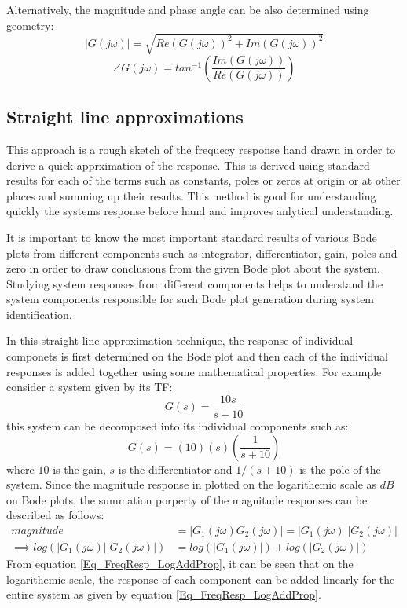 Alternatively, the magnitude and phase angle can be also determined using geometry:
\begin{equation} \label{Eq_FeResMagEquation}
	|G(j \omega)| = \sqrt{Re(G(j \omega))^{2} + Im(G(j \omega))^{2}}
\end{equation}
\begin{equation} \label{Eq_FeResPhaseEquation}
	\angle G(j \omega) = tan^{-1}\left( \frac{Im(G(j \omega))}{Re(G(j \omega))} \right)
\end{equation}

\subsection{Straight line approximations}

This approach is a rough sketch of the frequecy response hand drawn in order to derive a quick apprximation of the response. This is derived using standard results for each of the terms such as constants, poles or zeros at origin or at other places and summing up their results. This method is good for understanding quickly the systems response before hand and improves anlytical understanding.

It is important to know the most important standard results of various Bode plots from different components such as integrator, differentiator, gain, poles and zero in order to draw conclusions from the given Bode plot about the system. Studying system responses from different components helps to understand the system components responsible for such Bode plot generation during system identification.

In this straight line approximation technique, the response of individual componets is first determined on the Bode plot and then each of the individual responses is added together using some mathematical properties. For example consider a system given by its TF:
\begin{equation}
	G(s) = \frac{10 s}{s + 10}
\end{equation}
this system can be decomposed into its individual components such as:
\begin{equation}
	G(s) = (10) (s) \left( \frac{1}{s + 10} \right)
\end{equation}
where $10$ is the gain, $s$ is the differentiator and $1 / (s + 10)$ is the pole of the system. Since the magnitude response in plotted on the logarithemic scale as $dB$ on Bode plots, the summation porperty of the magnitude responses can be described as follows:
\begin{align}
	magnitude &= |G_{1}(j\omega) G_{2}(j\omega)| = |G_{1}(j\omega)||G_{2}(j\omega)| \\
	\implies log(|G_{1}(j\omega)||G_{2}(j\omega)|) &= log(|G_{1}(j\omega)|) + log(|G_{2}(j\omega)|) \label{Eq_FreqResp_LogAddProp}
\end{align}
From equation \eqref{Eq_FreqResp_LogAddProp}, it can be seen that on the logarithemic scale, the response of each component can be added linearly for the entire system as given by equation \eqref{Eq_FreqResp_LogAddProp}.

